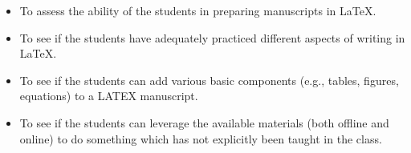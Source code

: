 \documentclass[18pt]{article}
\begin{document}
\begin{itemize}
    \item \Large{To assess the ability of the students in preparing manuscripts in \LaTeX.}
    \item  To see if the students have adequately practiced different aspects of writing in \LaTeX.
    \item To see if the students can add various basic components (e.g., tables, figures, equations) to a LATEX manuscript.
    \item To see if the students can leverage the available materials (both offline and online) to do something which has not explicitly been taught in the class.
    \end{itemize}
    
\end{document}
